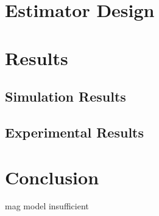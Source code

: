 \documentclass[conference]{IEEEtran}
\begin{document}
\section{Estimator Design}



\section{Results}
\subsection{Simulation Results}

\subsection{Experimental Results}



\section{Conclusion}
mag model insufficient %







\newpage
{}






\end{document}
